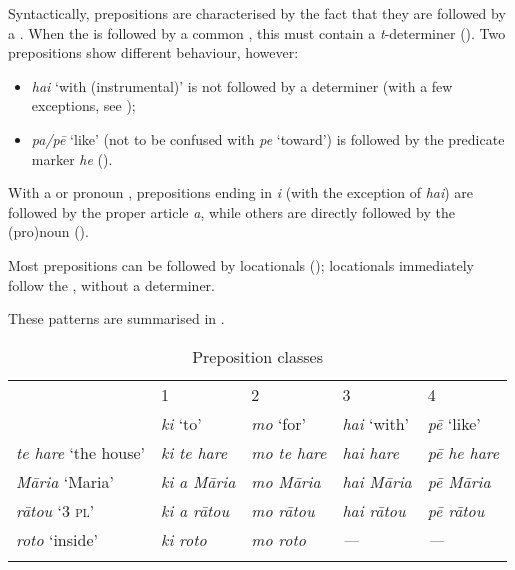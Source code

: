 Syntactically, prepositions are characterised by the fact that they are followed by a . When the  is followed by a common , this  must contain a \textit{t}{}-determiner (). Two prepositions show different behaviour, however:

\begin{itemize}
\item 
\textit{hai} ‘with (instrumental)’ is not followed by a determiner (with a few exceptions, see );

\item 
\textit{pa/pē} ‘like’ (not to be confused with \textit{pe} ‘toward’) is followed by the predicate marker \textit{he} ().

\end{itemize}

With a  or pronoun , prepositions ending in \textit{i} (with the exception of \textit{hai}) are followed by the proper article \textit{a}, while others are directly followed by the (pro)noun (). 

Most prepositions can be followed by locationals (); locationals immediately follow the , without a determiner.

These patterns are summarised in .

\begin{table}
\begin{tabularx}{\textwidth}{XL{19mm}L{19mm}L{19mm}L{18mm}} 
\lsptoprule
&  {1} &  {2} &  {3} &  {4}\\
& \textit{ki} ‘to’ & \textit{mo} ‘for’ & \textit{hai} ‘with’ & \textit{pē} ‘like’\\
\midrule
\textit{te hare} ‘the house’ & \textit{ki te hare} & \textit{mo te hare} & \textit{hai hare} & \textit{pē he hare}\\
\textit{Māria} ‘Maria’ & \textit{ki a Māria} & \textit{mo Māria} & \textit{hai Māria}\footnotemark{} & \textit{pē Māria}\\
\textit{rātou} ‘3 \textsc{pl}’ & \textit{ki a rātou} & \textit{mo rātou} & \textit{hai rātou} & \textit{pē rātou}\\
{\textit{roto} ‘inside’} & {\textit{ki roto}} & {\textit{mo roto}} & \textit{—} & {\textit{—}}\\
\lspbottomrule
\end{tabularx}
\caption{Preposition classes}
\label{tab:34}
\end{table}


